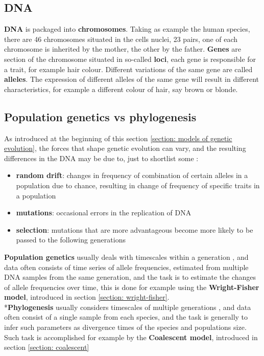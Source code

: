 \documentclass[12pt,mythesisstyle]{report}
\begin{document}
\subsection{DNA}
\textbf{DNA} is packaged into \textbf{chromosomes}. Taking as example the human species, there are 46 chromosomes situated in the cells nuclei, 23 pairs, one of each chromosome is inherited by the mother, the other by the father. \textbf{Genes} are section of the chromosome situated in so-called \textbf{loci}, each gene is responsible for a trait, for example hair colour. Different variations of the same gene are called \textbf{alleles}. The expression of different alleles of the same gene will result in different characteristics, for example a different colour of hair, say brown or blonde.

\subsection{Population genetics vs phylogenesis}\label{section: genetics vs phylogenesis}
As introduced at the beginning of this section \ref{section: models of genetic evolution}, the forces that shape genetic evolution can vary, and the resulting differences in the DNA may be due to, just to shortlist some  \cite{wrightexplained}:
\begin{itemize}
	\item \textbf{random drift}: changes in frequency of combination of certain alleles in a population due to chance, resulting in change of frequency of specific traits in a population
	\item \textbf{mutations}: occasional errors in the replication of DNA
	\item \textbf{selection}: mutations that are more advantageous become more likely to be passed to the following generations
\end{itemize}
\textbf{Population genetics} usually deals with timescales within a generation \cite{wrightexplained}, and data often consists of time series of allele frequencies, estimated from multiple DNA samples from the same generation, and the task is to estimate the changes of allele frequencies over time, this is done for example using the \textbf{Wright-Fisher model}, introduced in section \ref{section: wright-fisher}.
\\*\textbf{Phylogenesis} usually considers timescales of multiple generations \cite{wrightexplained}, and data often consist of a single sample from each species, and the task is generally to infer such parameters as divergence times of the species and populations size. Such task is accomplished for example by the \textbf{Coalescent model}, introduced in section \ref{section: coalescent}
\end{document}

